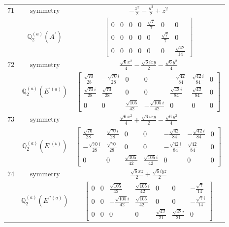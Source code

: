\documentclass[fleqn,8pt,landscape]{jsarticle}
\begin{document}
\begin{longtable}{ccc}
$ 71 $ & $ \text{symmetry} $ & $ - \frac{x^{2}}{2} - \frac{y^{2}}{2} + z^{2} $ \\
$  $ & $ \mathbb{Q}_{2}^{(a)}(A^{\prime}) $ & $ \begin{bmatrix} 0 & 0 & 0 & 0 & \frac{\sqrt{7}}{7} & 0 & 0 \\ 0 & 0 & 0 & 0 & 0 & \frac{\sqrt{7}}{7} & 0 \\ 0 & 0 & 0 & 0 & 0 & 0 & \frac{\sqrt{42}}{14} \end{bmatrix} $ \\ \hline
$ 72 $ & $ \text{symmetry} $ & $ \frac{\sqrt{6} x^{2}}{4} - \frac{\sqrt{6} i x y}{2} - \frac{\sqrt{6} y^{2}}{4} $ \\
$  $ & $ \mathbb{Q}_{2}^{(a)}(E^{\prime(a)}) $ & $ \begin{bmatrix} \frac{\sqrt{70}}{28} & - \frac{\sqrt{70} i}{28} & 0 & 0 & - \frac{\sqrt{42}}{84} & \frac{\sqrt{42} i}{84} & 0 \\ \frac{\sqrt{70} i}{28} & \frac{\sqrt{70}}{28} & 0 & 0 & \frac{\sqrt{42} i}{84} & \frac{\sqrt{42}}{84} & 0 \\ 0 & 0 & \frac{\sqrt{105}}{42} & - \frac{\sqrt{105} i}{42} & 0 & 0 & 0 \end{bmatrix} $ \\ \hline
$ 73 $ & $ \text{symmetry} $ & $ \frac{\sqrt{6} x^{2}}{4} + \frac{\sqrt{6} i x y}{2} - \frac{\sqrt{6} y^{2}}{4} $ \\
$  $ & $ \mathbb{Q}_{2}^{(a)}(E^{\prime(b)}) $ & $ \begin{bmatrix} \frac{\sqrt{70}}{28} & \frac{\sqrt{70} i}{28} & 0 & 0 & - \frac{\sqrt{42}}{84} & - \frac{\sqrt{42} i}{84} & 0 \\ - \frac{\sqrt{70} i}{28} & \frac{\sqrt{70}}{28} & 0 & 0 & - \frac{\sqrt{42} i}{84} & \frac{\sqrt{42}}{84} & 0 \\ 0 & 0 & \frac{\sqrt{105}}{42} & \frac{\sqrt{105} i}{42} & 0 & 0 & 0 \end{bmatrix} $ \\ \hline
$ 74 $ & $ \text{symmetry} $ & $ \frac{\sqrt{6} x z}{2} + \frac{\sqrt{6} i y z}{2} $ \\
$  $ & $ \mathbb{Q}_{2}^{(a)}(E^{\prime\prime(a)}) $ & $ \begin{bmatrix} 0 & 0 & \frac{\sqrt{105}}{42} & \frac{\sqrt{105} i}{42} & 0 & 0 & - \frac{\sqrt{7}}{14} \\ 0 & 0 & - \frac{\sqrt{105} i}{42} & \frac{\sqrt{105}}{42} & 0 & 0 & - \frac{\sqrt{7} i}{14} \\ 0 & 0 & 0 & 0 & \frac{\sqrt{42}}{21} & \frac{\sqrt{42} i}{21} & 0 \end{bmatrix} $ \\ \hline

\end{longtable}
\end{document}
